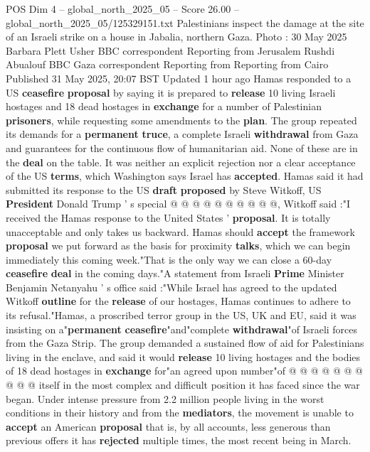 \begin{textsample}{POS Dim 4 – global\_north\_2025\_05 – Score 26.00 – global\_north\_2025\_05/125329151.txt}  \label{ex:f4_pos_192}
Palestinians inspect the damage at the site of an Israeli strike on a house in Jabalia, northern Gaza.
Photo : 30 May 2025 Barbara Plett Usher BBC correspondent Reporting from Jerusalem Rushdi Abualouf BBC Gaza correspondent Reporting from Reporting from Cairo Published 31 May 2025, 20:07 BST Updated 1 hour ago Hamas responded to a US \textbf{ceasefire} \textbf{proposal} by saying it is prepared to \textbf{release} 10 living Israeli hostages and 18 dead hostages in \textbf{exchange} for a number of Palestinian \textbf{prisoners}, while requesting some amendments to the \textbf{plan}.
The group repeated its demands for a \textbf{permanent} \textbf{truce}, a complete Israeli \textbf{withdrawal} from Gaza and guarantees for the continuous flow of humanitarian aid.
None of these are in the \textbf{deal} on the table.
It was neither an explicit rejection nor a clear acceptance of the US \textbf{terms}, which Washington says Israel has \textbf{accepted}.
Hamas said it had submitted its response to the US \textbf{draft} \textbf{proposed} by Steve Witkoff, US \textbf{President} Donald Trump ' s special @ @ @ @ @ @ @ @ @ @, Witkoff said :"I received the Hamas response to the United States ' \textbf{proposal}.
It is totally unacceptable and only takes us backward.
Hamas should \textbf{accept} the framework \textbf{proposal} we put forward as the basis for proximity \textbf{talks}, which we can begin immediately this coming week."That is the only way we can close a 60-day \textbf{ceasefire} \textbf{deal} in the coming days."A statement from Israeli \textbf{Prime} Minister Benjamin Netanyahu ' s office said :"While Israel has agreed to the updated Witkoff \textbf{outline} for the \textbf{release} of our hostages, Hamas continues to adhere to its refusal."Hamas, a proscribed terror group in the US, UK and EU, said it was insisting on a"\textbf{permanent} \textbf{ceasefire}"and"complete \textbf{withdrawal}"of Israeli forces from the Gaza Strip.
The group demanded a sustained flow of aid for Palestinians living in the enclave, and said it would \textbf{release} 10 living hostages and the bodies of 18 dead hostages in \textbf{exchange} for"an agreed upon number"of @ @ @ @ @ @ @ @ @ @ itself in the most complex and difficult position it has faced since the war began.
Under intense pressure from 2.2 million people living in the worst conditions in their history and from the \textbf{mediators}, the movement is unable to \textbf{accept} an American \textbf{proposal} that is, by all accounts, less generous than previous offers it has \textbf{rejected} multiple times, the most recent being in March.

\end{textsample}
